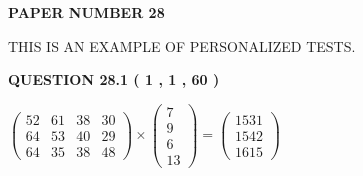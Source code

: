 \documentclass[12pt]{article}
\begin{document}
   
   
   
\newpage 
\setcounter{page}{ 
    28001 } 
   
   
   
   
 {\textbf{ \Large{ PAPER NUMBER           28  }}}
   
   
\vspace{0.2in}
   
   
   
   
   
   
 \vspace{0.2in}
{\Huge  THIS IS AN EXAMPLE OF}
{\Huge  PERSONALIZED TESTS. }
   
   
  
\vspace{0.2in}
  
{\textbf{\Large{QUESTION
28.1 
 (           1 ,           1 ,          60 )
}}}
  
  
 
 
\noindent{}

 
$\left( \begin{array}{ccccccccccccccc}
          52  & 
          61  & 
          38  & 
          30  \\ 
          64  & 
          53  & 
          40  & 
          29  \\ 
          64  & 
          35  & 
          38  & 
          48
\end{array}\right) \times
\left( \begin{array}{c}
           7  \\ 
           9  \\ 
           6  \\ 
          13
\end{array}\right)  =
\left( \begin{array}{c}
        1531  \\ 
        1542  \\ 
        1615
\end{array}\right)  $
 
\end{document}
